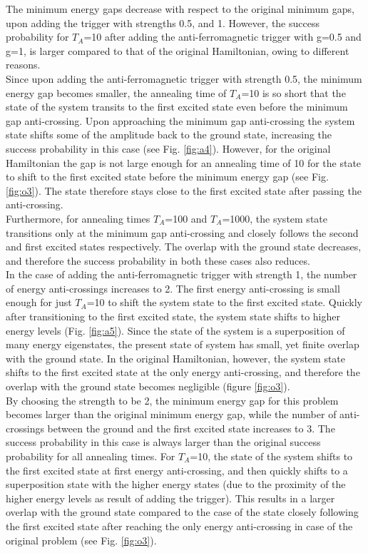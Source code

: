 \documentclass[../main.tex]{subfiles}
\begin{document}
The minimum energy gaps decrease with respect to the original minimum gaps, upon adding the trigger with strengths 0.5, and 1. However, the success probability for $T_A$=10 after adding the anti-ferromagnetic trigger with g=0.5 and g=1, is larger compared to that of the original Hamiltonian, owing to different reasons.\\

Since upon adding the anti-ferromagnetic trigger with strength 0.5, the minimum energy gap becomes smaller, the annealing time of $T_A$=10 is so short that the state of the system transits to the first excited state even before the minimum gap anti-crossing. Upon approaching the minimum gap anti-crossing the system state shifts some of the amplitude back to the ground state, increasing the success probability in this case (see Fig. \ref{fig:a4}). However, for the original Hamiltonian the gap is not large enough for an annealing time of 10 for the state to shift to the first excited state before the minimum energy gap (see Fig. \ref{fig:o3}). The state therefore stays close to the first excited state after passing the anti-crossing.\\
Furthermore, for annealing times $T_A$=100 and $T_A$=1000, the system state transitions only at the minimum gap anti-crossing and closely follows the second and first excited states respectively. The overlap with the ground state decreases, and therefore the success probability in both these cases also reduces.\\

In the case of adding the anti-ferromagnetic trigger with strength 1, the number of energy anti-crossings increases to 2. The first energy anti-crossing is small enough for just $T_A$=10 to shift the system state to the first excited state. Quickly after transitioning to the first excited state, the system state shifts to higher energy levels (Fig. \ref{fig:a5}). Since the state of the system is a superposition of many energy eigenstates, the present state of system has small, yet finite overlap with the ground state. In the original Hamiltonian, however, the system state shifts to the first excited state at the only energy anti-crossing, and therefore the overlap with the ground state becomes negligible (figure \ref{fig:o3}).\\

By choosing the strength to be 2, the minimum energy gap for this problem becomes larger than the original minimum energy gap, while the number of anti-crossings between the ground and the first excited state increases to 3. The success probability in this case is always larger than the original success probability for all annealing times. For $T_A$=10, the state of the system shifts to the first excited state at first energy anti-crossing, and then quickly shifts to a superposition state with the higher energy states (due to the proximity of the higher energy levels as result of adding the trigger). This results in a larger overlap with the ground state compared to the case of the state closely following the first excited state after reaching the only energy anti-crossing in case of the original problem (see Fig. \ref{fig:o3}).
\end{document}
